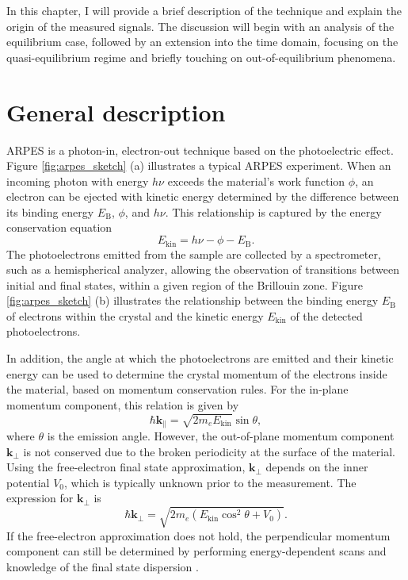 In this chapter, I will provide a brief description of the technique and explain the origin of the measured signals.
The discussion will begin with an analysis of the equilibrium case, followed by an extension into the time domain, focusing on the quasi-equilibrium regime and briefly touching on out-of-equilibrium phenomena.

\section{General description}

ARPES is a photon-in, electron-out technique based on the photoelectric effect.
Figure \ref{fig:arpes_sketch} (a) illustrates a typical ARPES experiment.
When an incoming photon with energy $h\nu$ exceeds the material's work function $\phi$, an electron can be ejected with kinetic energy determined by the difference between its binding energy $E_\text{B}$, $\phi$, and $h\nu$.
This relationship is captured by the energy conservation equation
\begin{equation}
	E_\text{kin} = h\nu - \phi - E_\text{B}.
	\label{eq:e_cons}
\end{equation}
The photoelectrons emitted from the sample are collected by a spectrometer, such as a hemispherical analyzer, allowing the observation of transitions between initial and final states, within a given region of the Brillouin zone.
Figure \ref{fig:arpes_sketch} (b) illustrates the relationship between the binding energy $E_\text{B}$ of electrons within the crystal and the kinetic energy $E_\text{kin}$ of the detected photoelectrons.

In addition, the angle at which the photoelectrons are emitted and their kinetic energy can be used to determine the crystal momentum of the electrons inside the material, based on momentum conservation rules.
For the in-plane momentum component, this relation is given by
\begin{equation}
	\hbar \mathbf{k}_\parallel = \sqrt{2m_eE_\text{kin}} \sin\theta,
	\label{eq:mom}
\end{equation}
where $\theta$ is the emission angle.
However, the out-of-plane momentum component $\mathbf{k}_\perp$ is not conserved due to the broken periodicity at the surface of the material.
Using the free-electron final state approximation, $\mathbf{k}_\perp$ depends on the inner potential $V_0$, which is typically unknown prior to the measurement.
The expression for $\mathbf{k}_\perp$ is
\begin{equation}
	\hbar \mathbf{k}_\perp = \sqrt{2m_e\left(E_\text{kin}\cos^2\theta+V_0\right)}.
\end{equation}
If the free-electron approximation does not hold, the perpendicular momentum component can still be determined by performing energy-dependent scans and knowledge of the final state dispersion \cite{strocov_intrinsic_2003}.

